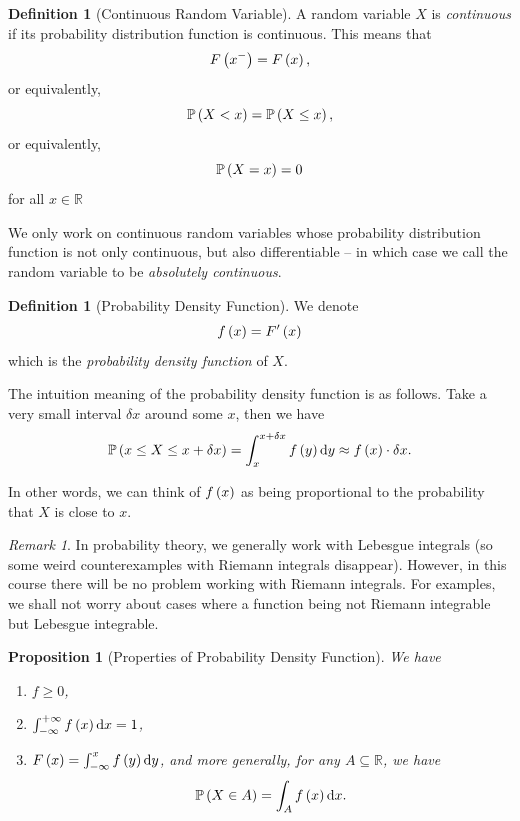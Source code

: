 \documentclass{article}
\newtheorem{proposition}[theorem]{Proposition}
\theoremstyle{definition}
\newtheorem{definition}[theorem]{Definition}
\theoremstyle{remark}
\newtheorem{remark}[theorem]{Remark}
\newcommand{\RR}{\mathbb{R}}
\newcommand{\Prob}{\mathbb{P}}
\newcommand{\plusinfty}{+\infty}
\newcommand{\minusinfty}{-\infty}
\begin{document}
\begin{definition}[Continuous Random Variable]
    \label{def:continuous-random-variable}%
    A random variable \(X\) is \emph{continuous} if its probability distribution function is continuous. This means that
    \[
        F\left(x^-\right) = F\left(x\right),
    \]
    or equivalently,
    \[
        \Prob\pqty{X < x} = \Prob\pqty{X \leq x},
    \]
    or equivalently,
    \[
        \Prob\pqty{X = x} = 0
    \]
    for all \(x \in \RR\)
\end{definition}

We only work on continuous random variables whose probability distribution function is not only continuous, but also differentiable -- in which case we call the random variable to be \emph{absolutely continuous}.

\begin{definition}[Probability Density Function]
    \label{def:probability-density-function}%
    We denote
    \[
        f\left(x\right) = F'\left(x\right)
    \]
    which is the \emph{probability density function} of \(X\).
\end{definition}

The intuition meaning of the probability density function is as follows. Take a very small interval \(\delta x\) around some \(x\), then we have
\[
    \Prob\pqty{x \leq X \leq x + \delta x} = \int_{x}^{x + \delta x} f\pqty{y} \dd{y} \approx f\pqty{x} \cdot \delta x.
\]

In other words, we can think of \(f\left(x\right)\) as being proportional to the probability that \(X\) is close to \(x\).

\begin{remark}
    In probability theory, we generally work with Lebesgue integrals (so some weird counterexamples with Riemann integrals disappear). However,  in this course there will be no problem working with Riemann integrals. For examples, we shall not worry about cases where a function being not Riemann integrable but Lebesgue integrable.
\end{remark}

\begin{proposition}[Properties of Probability Density Function]
    \label{prop:properties-probability-density-function}%
    We have
    \begin{enumerate}
        \item \(f \geq 0\),
        \item \(\int_{\minusinfty}^{\plusinfty} f\pqty{x} \dd{x} = 1\),
        \item \(F\pqty{x} = \int_{\minusinfty}^{x} f\pqty{y} \dd{y}\), and more generally, for any \(A \subseteq \RR\), we have
        \[
            \Prob\pqty{X \in A} = \int_{A} f\pqty{x} \dd{x}.
        \]
    \end{enumerate}
\end{proposition}
\end{document}
